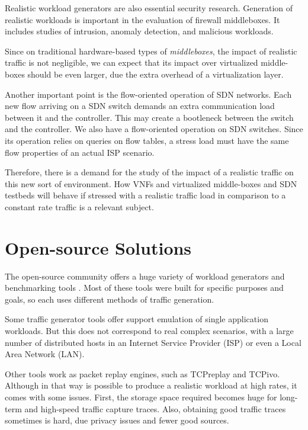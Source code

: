 Realistic workload generators are also essential security research\cite{ditg-paper}.  Generation of realistic workloads is important in the evaluation of firewall middleboxes. It includes studies of intrusion, anomaly detection, and malicious workloads\cite{ditg-paper}. 

Since on traditional hardware-based types of \textit{middleboxes}, the impact of realistic traffic is not negligible, we can expect that its impact over virtualized middle-boxes should be even larger, due the extra overhead of a virtualization layer. 


Another important point is the flow-oriented operation of SDN networks. Each new flow arriving on a SDN switch demands an extra communication load between it and the controller. This may create a bootleneck between the switch and the controller.  We also have a flow-oriented operation on SDN switches. Since its operation relies on queries on flow tables, a stress load must have the same flow properties of an actual ISP scenario.


Therefore, there is a demand for the study of the impact of a realistic traffic on this new sort of environment. How VNFs and virtualized middle-boxes and SDN testbeds will behave if stressed with a realistic traffic load in comparison to a constant rate traffic is a relevant subject.  


\section{Open-source Solutions}


The open-source community offers a huge variety of workload generators and benchmarking tools \cite{ditg-paper}\cite{validate-trafficgen}\cite{comparative-trafficgen-tools}\cite{performance-trafficgen}. Most of these tools were built for specific purposes and goals, so each uses different methods of traffic generation. 


Some traffic generator tools offer support emulation of single application workloads. But this does not correspond to real complex scenarios, with a large number of distributed hosts in an Internet Service Provider (ISP) or even a Local Area Network (LAN).


Other tools work as packet replay engines, such as TCPreplay and TCPivo. Although in that way is possible to produce a realistic workload at high rates, it comes with some issues. First, the storage space required becomes huge for long-term and high-speed traffic capture traces. Also, obtaining good traffic traces sometimes is hard, due privacy issues and fewer good sources. 


